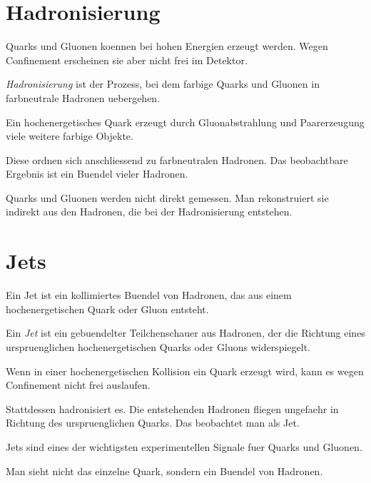 \section{Hadronisierung}

Quarks und Gluonen koennen bei hohen Energien erzeugt werden.
Wegen Confinement erscheinen sie aber nicht frei im Detektor.

\begin{definitionbox}
\emph{Hadronisierung} ist der Prozess, bei dem farbige Quarks und Gluonen in
farbneutrale Hadronen uebergehen.
\end{definitionbox}

\begin{conceptbox}
Ein hochenergetisches Quark erzeugt durch Gluonabstrahlung und Paarerzeugung viele
weitere farbige Objekte.

Diese ordnen sich anschliessend zu farbneutralen Hadronen.
Das beobachtbare Ergebnis ist ein Buendel vieler Hadronen.
\end{conceptbox}

\begin{examtipbox}
Quarks und Gluonen werden nicht direkt gemessen.
Man rekonstruiert sie indirekt aus den Hadronen, die bei der Hadronisierung entstehen.
\end{examtipbox}

\section{Jets}

Ein Jet ist ein kollimiertes Buendel von Hadronen, das aus einem hochenergetischen
Quark oder Gluon entsteht.

\begin{definitionbox}
Ein \emph{Jet} ist ein gebuendelter Teilchenschauer aus Hadronen, der die Richtung
eines urspruenglichen hochenergetischen Quarks oder Gluons widerspiegelt.
\end{definitionbox}

\begin{conceptbox}
Wenn in einer hochenergetischen Kollision ein Quark erzeugt wird, kann es wegen
Confinement nicht frei auslaufen.

Stattdessen hadronisiert es.
Die entstehenden Hadronen fliegen ungefaehr in Richtung des urspruenglichen Quarks.
Das beobachtet man als Jet.
\end{conceptbox}

\begin{notebox}
Jets sind eines der wichtigsten experimentellen Signale fuer Quarks und Gluonen.

Man sieht nicht das einzelne Quark, sondern ein Buendel von Hadronen.
\end{notebox}


